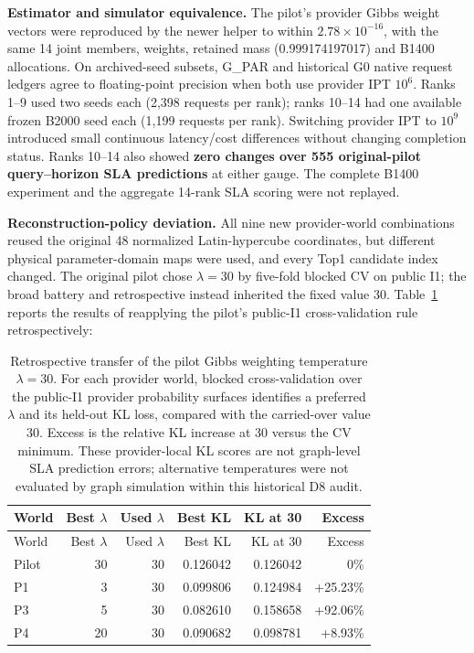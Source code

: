 \documentclass[10pt,a4paper]{article}
\begin{document}
\textbf{Estimator and simulator equivalence.} The pilot's provider Gibbs weight vectors were reproduced by the newer helper to within $2.78\times10^{-16}$, with the same 14 joint members, weights, retained mass (0.999174197017) and B1400 allocations. On archived-seed subsets, G\_PAR and historical G0 native request ledgers agree to floating-point precision when both use provider IPT $10^6$. Ranks 1--9 used two seeds each (2,398 requests per rank); ranks 10--14 had one available frozen B2000 seed each (1,199 requests per rank). Switching provider IPT to $10^9$ introduced small continuous latency/cost differences without changing completion status. Ranks 10--14 also showed \textbf{zero changes over 555 original-pilot query--horizon SLA predictions} at either gauge. The complete B1400 experiment and the aggregate 14-rank SLA scoring were not replayed.

\textbf{Reconstruction-policy deviation.} All nine new provider-world combinations reused the original 48 normalized Latin-hypercube coordinates, but different physical parameter-domain maps were used, and every Top1 candidate index changed. The original pilot chose $\lambda=30$ by five-fold blocked CV on public I1; the broad battery and retrospective instead inherited the fixed value 30. Table~\ref{tab:lambda-cv-transfer} reports the results of reapplying the pilot's public-I1 cross-validation rule retrospectively:

\begingroup\footnotesize\setlength{\tabcolsep}{3pt}
\begin{longtable}{@{}p{}rrrrr@{}}
\caption{Retrospective transfer of the pilot Gibbs weighting temperature $\lambda=30$. For each provider world, blocked cross-validation over the public-I1 provider probability surfaces identifies a preferred $\lambda$ and its held-out KL loss, compared with the carried-over value 30. Excess is the relative KL increase at 30 versus the CV minimum. These provider-local KL scores are not graph-level SLA prediction errors; alternative temperatures were not evaluated by graph simulation within this historical D8 audit.}\label{tab:lambda-cv-transfer}\\
\toprule
World & Best $\lambda$ & Used $\lambda$ & Best KL & KL at 30 & Excess \\
\midrule\endfirsthead
\toprule
World & Best $\lambda$ & Used $\lambda$ & Best KL & KL at 30 & Excess \\
\midrule\endhead
Pilot & 30 & 30 & 0.126042 & 0.126042 & 0\% \\
P1 & 3 & 30 & 0.099806 & 0.124984 & +25.23\% \\
P3 & 5 & 30 & 0.082610 & 0.158658 & +92.06\% \\
P4 & 20 & 30 & 0.090682 & 0.098781 & +8.93\% \\
\bottomrule
\end{longtable}\endgroup
\end{document}

